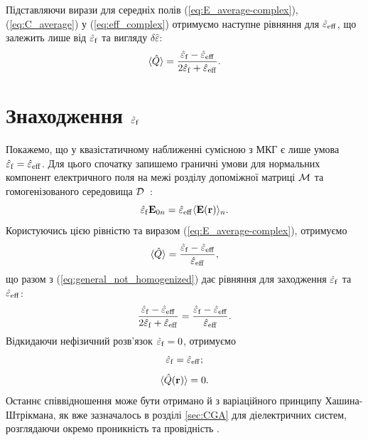 \documentclass[14pt,twoside]{vakthesis}
\begin{document}
Підставляючи вирази для середніх полів (\ref{eq:E_average-complex}), 
(\ref{eq:C_average}) у (\ref{eq:eff_complex}) отримуємо наступне 
рівняння для $\hat{\varepsilon}_{\rm eff}$, що залежить лише від 
$\hat{\varepsilon}_{\rm f}$ та вигляду $\delta\hat{\varepsilon}$:
\begin{equation}\label{eq:general_not_homogenized}
\langle \hat{Q} \rangle = \frac{\hat{\varepsilon}_{\rm f} - \hat{\varepsilon}_{\rm eff}}{2\hat{\varepsilon}_{\rm f} + \hat{\varepsilon}_{\rm eff}}.
\end{equation}


\section{Знаходження $\hat{\varepsilon}_{\rm f}$}\label{sec:eps-f}

Покажемо, що у квазістатичному наближенні сумісною з МКГ є лише умова $\hat{\varepsilon}_{\rm f} = \hat{\varepsilon}_{\rm eff}$.
Для цього спочатку запишемо граничні умови для нормальних компонент електричного поля на межі розділу допоміжної матриці $\cal{M}$ та гомогенізованого середовища $\cal D$~\cite{Sillars1937}:
\begin{equation}\label{eq:boundary}
\hat{\varepsilon}_{\rm f} {\bf E}_{0n} = \hat{\varepsilon}_{\rm eff} \langle {\bf E}({\bf r}) \rangle_{n}.
\end{equation}
Користуючись цією рівністю та виразом (\ref{eq:E_average-complex}), отримуємо 
\begin{equation}\label{eq:system_for_homog}
\langle \hat{Q} \rangle = \frac{\hat{\varepsilon}_{\rm f} - \hat{\varepsilon}_{\rm eff}}{\hat{\varepsilon}_{\rm eff}},
\end{equation}
що разом з (\ref{eq:general_not_homogenized}) дає рівняння для
заходження $\hat{\varepsilon}_{\rm f}$ та $\hat{\varepsilon}_{\rm eff}$:
\begin{equation}
	\frac{\hat{\varepsilon}_{\rm f} - \hat{\varepsilon}_{\rm eff}}{2\hat{\varepsilon}_{\rm f} + \hat{\varepsilon}_{\rm eff}} = \frac{\hat{\varepsilon}_{\rm f} - \hat{\varepsilon}_{\rm eff}}{\hat{\varepsilon}_{\rm eff}}.
\end{equation}
Відкидаючи нефізичний розв'язок 
$\hat{\varepsilon}_{\rm f} = 0$, отримуємо
\begin{equation}\label{eq:homog}
\hat{\varepsilon}_{\rm f} = \hat{\varepsilon}_{\rm eff};
\end{equation}
\begin{equation}\label{eq:general_Q}
\langle \hat{Q} ({\bf r}) \rangle = 0.
\end{equation}
Останнє співвідношення може бути отримано й з варіаційного принципу Ха\-шина-Штрік\-мана, як вже зазначалось в розділі \ref{sec:CGA} для діелектричних систем, розглядаючи окремо проникність та провідність \cite{Sushko2017, Torquato1991}.
\end{document}
